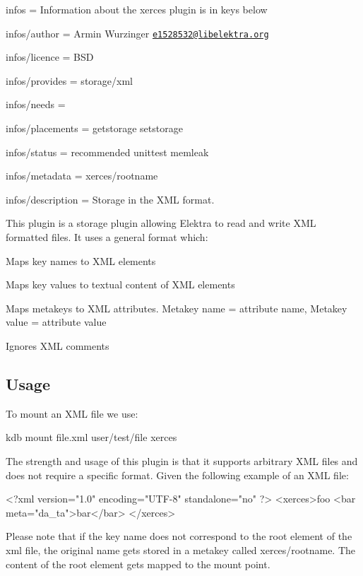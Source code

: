 
\begin{DoxyItemize}
\item infos = Information about the xerces plugin is in keys below
\item infos/author = Armin Wurzinger \href{mailto:e1528532@libelektra.org}{\tt e1528532@libelektra.\+org}
\item infos/licence = B\+SD
\item infos/provides = storage/xml
\item infos/needs =
\item infos/placements = getstorage setstorage
\item infos/status = recommended unittest memleak
\item infos/metadata = xerces/rootname
\item infos/description = Storage in the X\+ML format.
\end{DoxyItemize}

This plugin is a storage plugin allowing Elektra to read and write X\+ML formatted files. It uses a general format which\+:


\begin{DoxyItemize}
\item Maps key names to X\+ML elements
\item Maps key values to textual content of X\+ML elements
\item Maps metakeys to X\+ML attributes. Metakey name = attribute name, Metakey value = attribute value
\item Ignores X\+ML comments
\end{DoxyItemize}

\subsection*{Usage}

To mount an X\+ML file we use\+: \begin{DoxyVerb}    kdb mount file.xml user/test/file xerces
\end{DoxyVerb}


The strength and usage of this plugin is that it supports arbitrary X\+ML files and does not require a specific format. Given the following example of an X\+ML file\+: \begin{DoxyVerb}    <?xml version="1.0" encoding="UTF-8" standalone="no" ?>
    <xerces>foo
      <bar meta="da_ta">bar</bar>
    </xerces>
\end{DoxyVerb}


Please note that if the key name does not correspond to the root element of the xml file, the original name gets stored in a metakey called {\ttfamily xerces/rootname}. The content of the root element gets mapped to the mount point.

